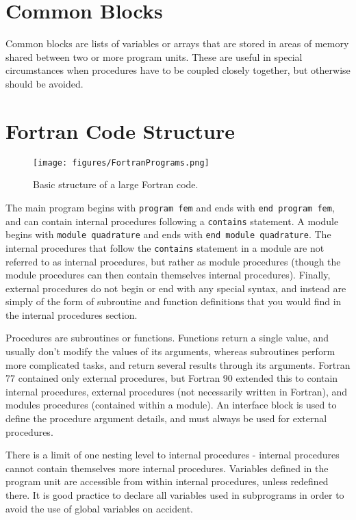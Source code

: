 \documentclass[10pt]{article}
\begin{document}
\section{Common Blocks}
Common blocks are lists of variables or arrays that are stored in areas of memory shared between two or more program units. These are useful in special circumstances when procedures have to be coupled closely together, but otherwise should be avoided. 

\section{Fortran Code Structure}

\begin{figure}[H]
\centering
\texttt{[image: figures/FortranPrograms.png]}
\caption{Basic structure of a large Fortran code.}
\end{figure}

The main program begins with {\tt program fem} and ends with {\tt end program fem}, and can contain internal procedures following a {\tt contains} statement. A module begins with {\tt module quadrature} and ends with {\tt end module quadrature}. The internal procedures that follow the {\tt contains} statement in a module are not referred to as internal procedures, but rather as module procedures (though the module procedures can then contain themselves internal procedures). Finally, external procedures do not begin or end with any special syntax, and instead are simply of the form of subroutine and function definitions that you would find in the internal procedures section.

Procedures are subroutines or functions. Functions return a single value, and usually don't modify the values of its arguments, whereas subroutines perform more complicated tasks, and return several results through its arguments. Fortran 77 contained only external procedures, but Fortran 90 extended this to contain internal procedures, external procedures (not necessarily written in Fortran), and modules procedures (contained within a module). An interface block is used to define the procedure argument details, and must always be used for external procedures.

There is a limit of one nesting level to internal procedures - internal procedures cannot contain themselves more internal procedures. Variables defined in the program unit are accessible from within internal procedures, unless redefined there. It is good practice to declare all variables used in subprograms in order to avoid the use of global variables on accident.
\end{document}
